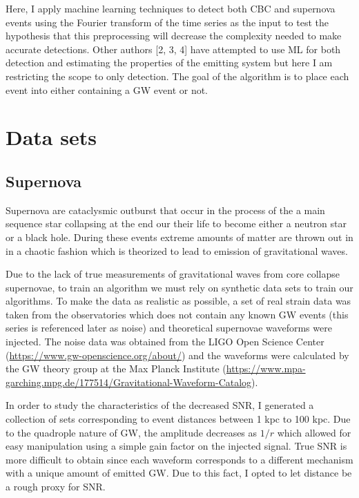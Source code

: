 \documentclass{article}
\begin{document}
Here, I apply machine learning techniques to detect both CBC and supernova events using the Fourier transform of the time series as the input to test the hypothesis that this preprocessing will decrease the complexity needed to make accurate detections. Other authors [2, 3, 4] have attempted to use ML for both detection and estimating the properties of the emitting system but here I am restricting the scope to only detection. The goal of the algorithm is to place each event into either containing a GW event or not.

\section{Data sets}
\subsection{Supernova}
Supernova are cataclysmic outburst that occur in the process of the a main sequence star collapsing at the end our their life to become either a neutron star or a black hole. During these events extreme amounts of matter are thrown out in in a chaotic fashion which is theorized to lead to emission of gravitational waves.

Due to the lack of true measurements of gravitational waves from core collapse supernovae, to train an algorithm we must rely on synthetic data sets to train our algorithms. To make the data as realistic as possible, a set of real strain data was taken from the observatories which does not contain any known GW events (this series is referenced later as noise) and theoretical supernovae waveforms were injected. The noise data was obtained from the LIGO Open Science Center (\href{https://www.gw-openscience.org/about/}{https://www.gw-openscience.org/about/}) and the waveforms were calculated by the GW theory group at the Max Planck Institute (\href{https://www.mpa-garching.mpg.de/177514/Gravitational-Waveform-Catalog}{https://www.mpa-garching.mpg.de/177514/Gravitational-Waveform-Catalog}).

In order to study the characteristics of the decreased SNR, I generated a collection of sets corresponding to event distances between 1 kpc to 100 kpc. Due to the quadrople nature of GW, the amplitude decreases as $1/r$ which allowed for easy manipulation using a simple gain factor on the injected signal. True SNR is more difficult to obtain since each waveform corresponds to a different mechanism with a unique amount of emitted GW. Due to this fact, I opted to let distance be a rough proxy for SNR.
\end{document}
